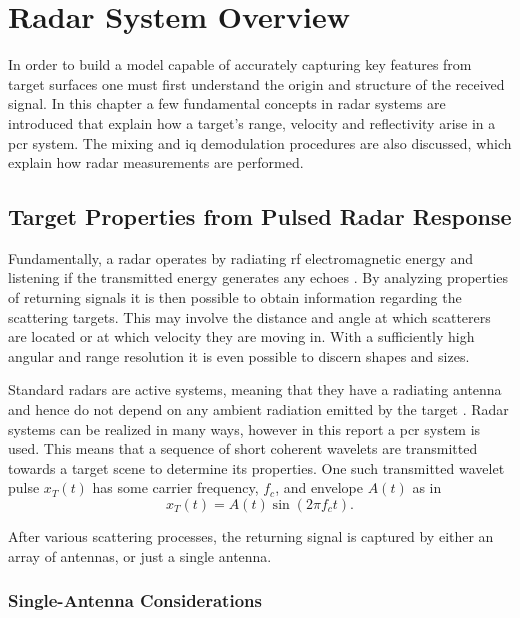 \chapter{Radar System Overview}

In order to build a model capable of accurately capturing key features from target surfaces one must first understand the origin and structure of the received signal. In this chapter a few fundamental concepts in radar systems are introduced that explain how a target's range, velocity and reflectivity arise in a \gls{pcr} system. The mixing and \gls{iq} demodulation procedures are also discussed, which explain how radar measurements are performed.  

\section{Target Properties from Pulsed Radar Response}
Fundamentally, a radar operates by radiating \gls{rf} electromagnetic energy and listening if the transmitted energy generates any echoes \citep{skolnik_2009}. By analyzing properties of returning signals it is then possible to obtain information regarding the scattering targets. This may involve the distance and angle at which scatterers are located or at which velocity they are moving in. With a sufficiently high angular and range resolution it is even possible to discern shapes and sizes.  

Standard radars are active systems, meaning that they have a radiating antenna and hence do not depend on any ambient radiation emitted by the target \citep{richards_2014}. Radar systems can be realized in many ways, however in this report a \gls{pcr} system is used. This means that a sequence of short coherent wavelets are transmitted towards a target scene to determine its properties. One such transmitted wavelet pulse $x_T(t)$ has some carrier frequency, $f_c$, and envelope $A(t)$ as in
\begin{equation}\label{eq:trans}
	x_T(t)
	= A(t)\sin(2\pi f_c t).
\end{equation}

After various scattering processes, the returning signal is captured by either an array of antennas, or just a single antenna.

\subsection{Single-Antenna Considerations}

